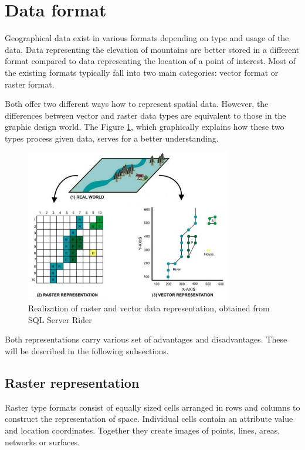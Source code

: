 \documentclass[thesis=M,english]{FITthesis}[2012/10/20]
\begin{document}
\section{Data format}
Geographical data exist in various formats depending on type and usage of the data. Data representing the elevation of mountains are better stored in a different format compared to data representing the location of a point of interest. 
Most of the existing formats typically fall into two main categories: vector format or raster format. 

Both offer two different ways how to represent spatial data. However, the differences between vector and raster data types are equivalent to those in the graphic design world. The Figure \ref{pic:RasterVector}, which graphically explains how these two types process given data, serves for a better understanding.

\begin{figure}[h]
\centering
\includegraphics[width=0.8\textwidth]{pics/RasterVectorPreview}
\caption{Realization of raster and vector data representation, obtained from SQL Server Rider \cite{SQL13}}
\label{pic:RasterVector}
\end{figure}

Both representations carry various set of advantages and disadvantages. These will be described in the following subsections.

\subsection{Raster representation}
Raster type formats consist of equally sized cells arranged in rows and columns to construct the representation of space. Individual cells contain an attribute value and location coordinates. Together they create images of points, lines, areas, networks or surfaces.
\end{document}
